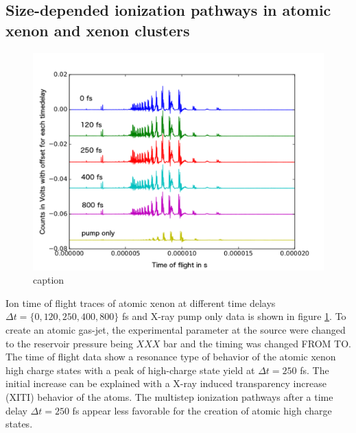 \subsection{Size-depended ionization pathways in atomic xenon and xenon clusters}
\begin{figure}
	\centering
		\includegraphics[width=1.00\textwidth]{images/results/TOF-atomic-xenon.png}
	\caption{caption}
	\label{fig:TOF-atomic-xenon}
\end{figure}
Ion time of flight traces of atomic xenon at different time delays $\Delta t = \{0, 120, 250, 400, 800\}$ fs and X-ray pump only data is shown in figure \ref{fig:TOF-atomic-xenon}. To create an atomic gas-jet, the experimental parameter at the source were changed to the reservoir pressure being $XXX$ bar and the timing was changed FROM TO. The time of flight data show a resonance type of behavior of the atomic xenon high charge states with a peak of high-charge state yield at $\Delta t = 250$ fs. The initial increase can be explained with a X-ray induced transparency increase (XITI) \citep{Schorb-2012-PRL} behavior of the atoms. The multistep ionization pathways after a time delay $\Delta t = 250$ fs appear less favorable for the creation of atomic high charge states.\\

